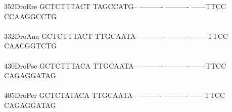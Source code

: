 \documentclass[11pt,twoside,reqno,a4paper]{article}
\begin{document}
{352\hspace*{1\charwidth}DroEre	GCTCTTTACT	TAGCCATG--	----------	----------	------TTCC	CCAAGGCCTG	\\
\hspace*{4\charwidth}\hspace*{7\charwidth}\hspace*{1\charwidth}\hspace*{1\charwidth}\hspace*{1\charwidth}\hspace*{1\charwidth}\hspace*{1\charwidth}\hspace*{1\charwidth}\\
332\hspace*{1\charwidth}DroAna	GCTCTTTACT	TTGCAATA--	----------	----------	------TTCC	CAACGGTCTG	\\
\hspace*{4\charwidth}\hspace*{7\charwidth}\hspace*{1\charwidth}\hspace*{1\charwidth}\hspace*{1\charwidth}\hspace*{1\charwidth}\hspace*{1\charwidth}\hspace*{1\charwidth}\\
430\hspace*{1\charwidth}DroPse	GCTCTTTACA	TTGCAATA--	----------	----------	------TTCC	CAGAGGATAG	\\
\hspace*{4\charwidth}\hspace*{7\charwidth}\hspace*{1\charwidth}\hspace*{1\charwidth}\hspace*{1\charwidth}\hspace*{1\charwidth}\hspace*{1\charwidth}\hspace*{1\charwidth}\\
405\hspace*{1\charwidth}DroPer	GCTCTATACA	TTGCAATA--	----------	----------	------TTCC	CAGAGGATAG	\\
\hspace*{4\charwidth}\hspace*{7\charwidth}\hspace*{1\charwidth}\hspace*{1\charwidth}\hspace*{1\charwidth}\hspace*{1\charwidth}\hspace*{1\charwidth}\hspace*{1\charwidth}\\
}
\end{document}
